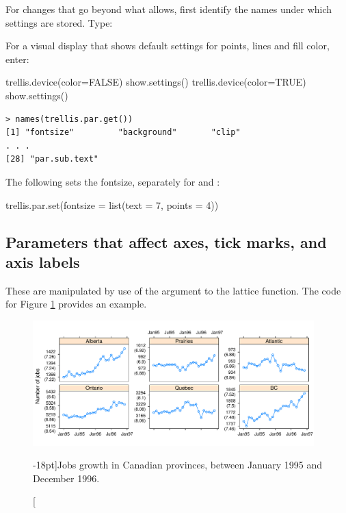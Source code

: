 For changes that go beyond what  allows, first
identify the names under which settings are stored. Type:
\begin{marginfigure}
For a visual display that shows default settings for
  points, lines and fill color, enter:
\begin{Schunk}
\begin{Sinput}
trellis.device(color=FALSE)
show.settings()
trellis.device(color=TRUE)
show.settings()
\end{Sinput}
\end{Schunk}
\end{marginfigure}
\begin{verbatim}
> names(trellis.par.get())
[1] "fontsize"         "background"       "clip"
. . .
[28] "par.sub.text"
\end{verbatim}

The following sets the fontsize, separately for  and
:\\[-6pt]

\noindent
\begin{minipage}[t]{1.175\textwidth}
\begin{Schunk}
\begin{Sinput}
trellis.par.set(fontsize = list(text = 7,
                                points = 4))
\end{Sinput}
\end{Schunk}
\end{minipage}

\subsection*{Parameters that affect axes, tick marks, and axis labels}
\label{ss:lattice-axis}

These are manipulated by use of the  argument to
the lattice function. The code for Figure \ref{fig:jobsplot}
provides an example.
\begin{figure}[h]
\begin{Schunk}


\centerline{\includegraphics[width=0.97\textwidth]{figs/09-jobsplot-1} }

\end{Schunk}
\caption[][-18pt]{Jobs growth in Canadian provinces, between January 1995
  and December 1996.}\label{fig:jobsplot}
\vspace*{18pt}
\end{figure}

